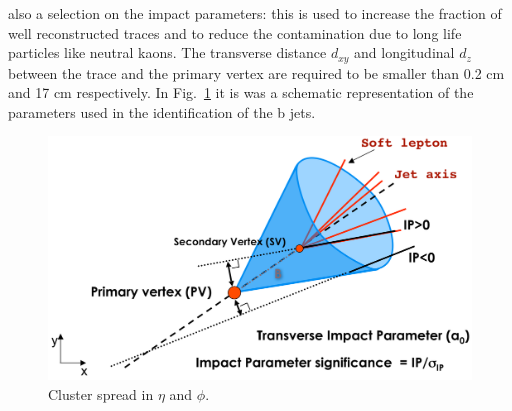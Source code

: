 also a selection on the impact parameters: this is used to increase
the fraction of well reconstructed traces and to reduce the contamination due to long life particles like neutral kaons.
The transverse distance $d_{xy}$ and longitudinal $d_z$ between the trace and the primary vertex
are required to be smaller than 0.2 cm and 17 cm respectively.
In Fig.~\ref{bj}  it is
was a schematic representation of the parameters used in the identification
of the b jets.
\begin{figure}
\centering
\includegraphics[scale= 0.5]{../Cap4/btag}
\caption{Cluster spread in $\eta$ and $\phi$.}
\label{bj}
\end{figure}
